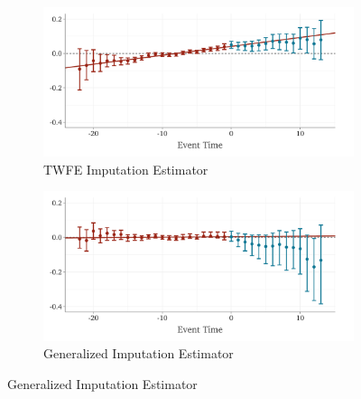 \documentclass[12pt]{article}
\begin{document}
\begin{figure}
  \caption{Effect of Walmart on County $\log$ Wholesale Retail Employment}
  \label{fig:walmart_wholesale}

  \begin{center}
    \begin{subfigure}[b]{0.75\textwidth}
      \caption{TWFE Imputation Estimator}
      \begin{adjustbox}{width=\textwidth, center}
        \includegraphics{plot_did2s_wholesale.pdf}
      \end{adjustbox}
    \end{subfigure}
    \end{center}
    \begin{center}
    \begin{subfigure}[b]{0.75\textwidth}
      \caption{Generalized Imputation Estimator}
      \begin{adjustbox}{width=\textwidth, center}
        \includegraphics{plot_qld_wholesale.pdf}
      \end{adjustbox}
    \end{subfigure}
  \end{center}


\end{figure}
\end{document}
